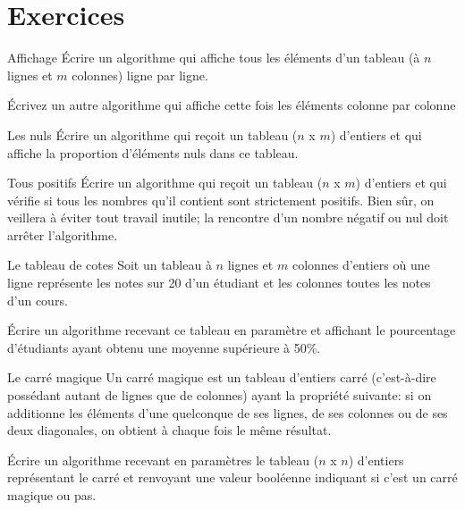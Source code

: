 \section{Exercices}

	\begin{Exercice}{Affichage}
		Écrire un algorithme qui affiche tous les éléments d'un
		tableau (à $n$ lignes et $m$ colonnes) ligne par ligne.
		
		Écrivez un autre algorithme qui affiche cette fois les éléments
		colonne par colonne
	\end{Exercice}
	
	\begin{Exercice}{Les nuls}
		Écrire un algorithme qui reçoit un tableau ($n$ x $m$)
		d'entiers et qui affiche la proportion
		d'éléments nuls dans ce tableau.
	\end{Exercice}
	
	\begin{Exercice}{Tous positifs}
		Écrire un algorithme qui reçoit un tableau ($n$ x $m$) d’entiers et qui vérifie
		si tous les nombres qu’il contient sont strictement positifs. Bien sûr,
		on veillera à éviter tout travail inutile; la rencontre d’un nombre
		négatif ou nul doit arrêter l'algorithme.
	\end{Exercice}
	
	\begin{Exercice}{Le tableau de cotes}
		Soit un tableau à $n$ lignes et $m$ colonnes d'entiers où
		une ligne représente les notes sur 20 d'un étudiant et
		les colonnes toutes les notes d'un cours.
		
		Écrire un algorithme recevant ce tableau en paramètre et affichant le
		pourcentage d'étudiants ayant obtenu une moyenne
		supérieure à 50\%.
	\end{Exercice}
	
	\begin{Exercice}{Le carré magique}
		Un carré magique est un tableau d’entiers carré
		(c'est-à-dire possédant autant de lignes que de
		colonnes) ayant la propriété suivante: si on additionne les éléments
		d'une quelconque de ses lignes, de ses colonnes ou de
		ses deux diagonales, on obtient à chaque fois le même résultat.
	
		Écrire un algorithme recevant en paramètres le tableau ($n$ x $n$)
		d'entiers représentant le carré et renvoyant une valeur booléenne
		indiquant si c'est un carré magique ou pas.
	\end{Exercice}
	
